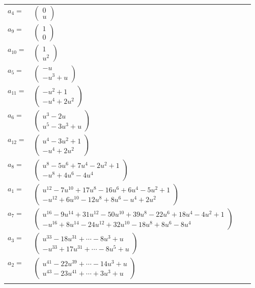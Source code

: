 \documentclass[1p]{elsarticle_modified}
\theoremstyle{definition}
\begin{document}
\begin{tabular}{m{7pt} m{180pt} m{7pt} m{180pt} }
\flushright $a_{4}=$&$\begin{pmatrix}0\\u\end{pmatrix}$ \\
\flushright $a_{9}=$&$\begin{pmatrix}1\\0\end{pmatrix}$ \\
\flushright $a_{10}=$&$\begin{pmatrix}1\\u^2\end{pmatrix}$ \\
\flushright $a_{5}=$&$\begin{pmatrix}- u\\- u^3+u\end{pmatrix}$ \\
\flushright $a_{11}=$&$\begin{pmatrix}- u^2+1\\- u^4+2 u^2\end{pmatrix}$ \\
\flushright $a_{6}=$&$\begin{pmatrix}u^3-2 u\\u^5-3 u^3+u\end{pmatrix}$ \\
\flushright $a_{12}=$&$\begin{pmatrix}u^4-3 u^2+1\\- u^4+2 u^2\end{pmatrix}$ \\
\flushright $a_{8}=$&$\begin{pmatrix}u^8-5 u^6+7 u^4-2 u^2+1\\- u^8+4 u^6-4 u^4\end{pmatrix}$ \\
\flushright $a_{1}=$&$\begin{pmatrix}u^{12}-7 u^{10}+17 u^8-16 u^6+6 u^4-5 u^2+1\\- u^{12}+6 u^{10}-12 u^8+8 u^6- u^4+2 u^2\end{pmatrix}$ \\
\flushright $a_{7}=$&$\begin{pmatrix}u^{16}-9 u^{14}+31 u^{12}-50 u^{10}+39 u^8-22 u^6+18 u^4-4 u^2+1\\- u^{16}+8 u^{14}-24 u^{12}+32 u^{10}-18 u^8+8 u^6-8 u^4\end{pmatrix}$ \\
\flushright $a_{3}=$&$\begin{pmatrix}u^{33}-18 u^{31}+\cdots-8 u^3+u\\- u^{33}+17 u^{31}+\cdots-8 u^5+u\end{pmatrix}$ \\
\flushright $a_{2}=$&$\begin{pmatrix}u^{41}-22 u^{39}+\cdots-14 u^3+u\\u^{43}-23 u^{41}+\cdots+3 u^3+u\end{pmatrix}$\\&\end{tabular}
\end{document}
